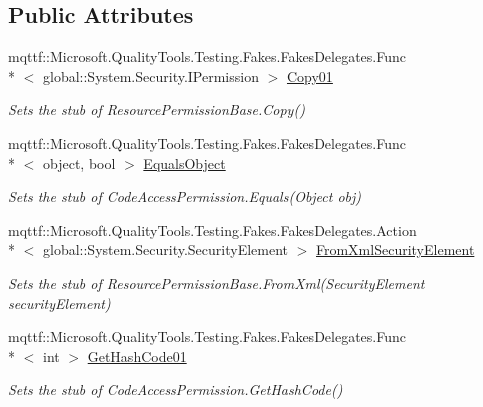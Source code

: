 \subsection*{Public Attributes}
\begin{DoxyCompactItemize}
\item 
mqttf\-::\-Microsoft.\-Quality\-Tools.\-Testing.\-Fakes.\-Fakes\-Delegates.\-Func\\*
$<$ global\-::\-System.\-Security.\-I\-Permission $>$ \hyperlink{class_system_1_1_security_1_1_permissions_1_1_fakes_1_1_stub_resource_permission_base_ace2e78f93a2510df21ee1a5212c3cb24}{Copy01}
\begin{DoxyCompactList}\small\item\em Sets the stub of Resource\-Permission\-Base.\-Copy()\end{DoxyCompactList}\item 
mqttf\-::\-Microsoft.\-Quality\-Tools.\-Testing.\-Fakes.\-Fakes\-Delegates.\-Func\\*
$<$ object, bool $>$ \hyperlink{class_system_1_1_security_1_1_permissions_1_1_fakes_1_1_stub_resource_permission_base_aaeffe4019e1e00b7b9c82cbb6f0e50d9}{Equals\-Object}
\begin{DoxyCompactList}\small\item\em Sets the stub of Code\-Access\-Permission.\-Equals(\-Object obj)\end{DoxyCompactList}\item 
mqttf\-::\-Microsoft.\-Quality\-Tools.\-Testing.\-Fakes.\-Fakes\-Delegates.\-Action\\*
$<$ global\-::\-System.\-Security.\-Security\-Element $>$ \hyperlink{class_system_1_1_security_1_1_permissions_1_1_fakes_1_1_stub_resource_permission_base_a73730a978239e4e44e06ae1f207df0fc}{From\-Xml\-Security\-Element}
\begin{DoxyCompactList}\small\item\em Sets the stub of Resource\-Permission\-Base.\-From\-Xml(\-Security\-Element security\-Element)\end{DoxyCompactList}\item 
mqttf\-::\-Microsoft.\-Quality\-Tools.\-Testing.\-Fakes.\-Fakes\-Delegates.\-Func\\*
$<$ int $>$ \hyperlink{class_system_1_1_security_1_1_permissions_1_1_fakes_1_1_stub_resource_permission_base_a010701b9028e73aeda4835510f53b3dc}{Get\-Hash\-Code01}
\begin{DoxyCompactList}\small\item\em Sets the stub of Code\-Access\-Permission.\-Get\-Hash\-Code()\end{DoxyCompactList}\item 

\end{DoxyCompactItemize}
